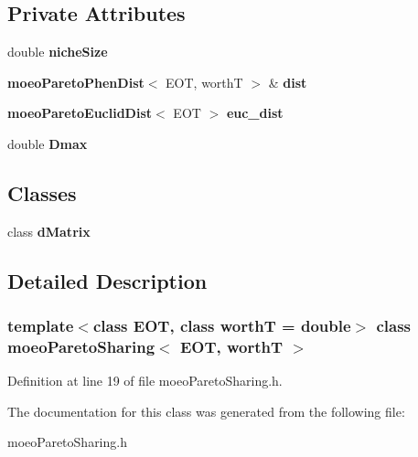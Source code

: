 \subsection*{Private Attributes}
\begin{CompactItemize}
\item 
double {\bf niche\-Size}\label{classmoeoParetoSharing_b5519750a3f30747cbabf67df9b4afd8}

\item 
{\bf moeo\-Pareto\-Phen\-Dist}$<$ EOT, worth\-T $>$ \& {\bf dist}\label{classmoeoParetoSharing_329d7d08f06988fcb0f03059c88ed209}

\item 
{\bf moeo\-Pareto\-Euclid\-Dist}$<$ EOT $>$ {\bf euc\_\-dist}\label{classmoeoParetoSharing_42bc90da2e7f3f7d3837484c771f638e}

\item 
double {\bf Dmax}\label{classmoeoParetoSharing_0219625f2dd8bfd9ae7cb3039084059f}

\end{CompactItemize}
\subsection*{Classes}
\begin{CompactItemize}
\item 
class {\bf d\-Matrix}
\end{CompactItemize}


\subsection{Detailed Description}
\subsubsection*{template$<$class EOT, class worth\-T = double$>$ class moeo\-Pareto\-Sharing$<$ EOT, worth\-T $>$}





Definition at line 19 of file moeo\-Pareto\-Sharing.h.

The documentation for this class was generated from the following file:\begin{CompactItemize}
\item 
moeo\-Pareto\-Sharing.h\end{CompactItemize}
